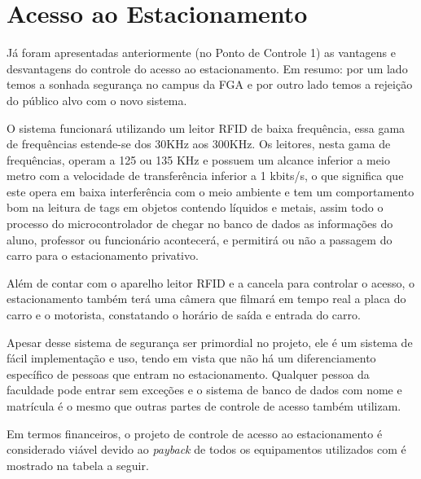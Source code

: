 \section{Acesso ao Estacionamento}

Já foram apresentadas anteriormente (no Ponto de Controle 1) as vantagens e desvantagens do controle do acesso ao estacionamento. Em resumo: por um lado temos a sonhada segurança no campus da FGA e por outro lado temos a rejeição do público alvo com o novo sistema.

O sistema funcionará utilizando um leitor RFID de baixa frequência, essa gama de frequências estende-se dos 30KHz aos 300KHz. Os leitores, nesta gama de frequências, operam a 125 ou 135 KHz e possuem um alcance inferior a meio metro com a velocidade de transferência inferior a 1 kbits/s, o que significa que este opera em baixa interferência com o meio ambiente e tem um comportamento bom na leitura de tags em objetos contendo líquidos e metais, assim todo o processo do microcontrolador de chegar no banco de dados as informações do aluno, professor ou funcionário acontecerá, e permitirá ou não a passagem do carro para o estacionamento privativo.

Além de contar com o aparelho leitor RFID e a cancela para controlar o acesso, o estacionamento também terá uma câmera que filmará em tempo real a placa do carro e o motorista, constatando o horário de saída e entrada do carro.

Apesar desse sistema de segurança ser primordial no projeto, ele é um sistema de fácil implementação e uso, tendo em vista que não há um diferenciamento específico de pessoas que entram no estacionamento. Qualquer pessoa da faculdade pode entrar sem exceções e o sistema de banco de dados com nome e matrícula é o mesmo que outras partes de controle de acesso também utilizam.

Em termos financeiros, o projeto de controle de acesso ao estacionamento é considerado viável devido ao \textit{payback} de todos os equipamentos utilizados com é mostrado na tabela a seguir.

\pagebreak

